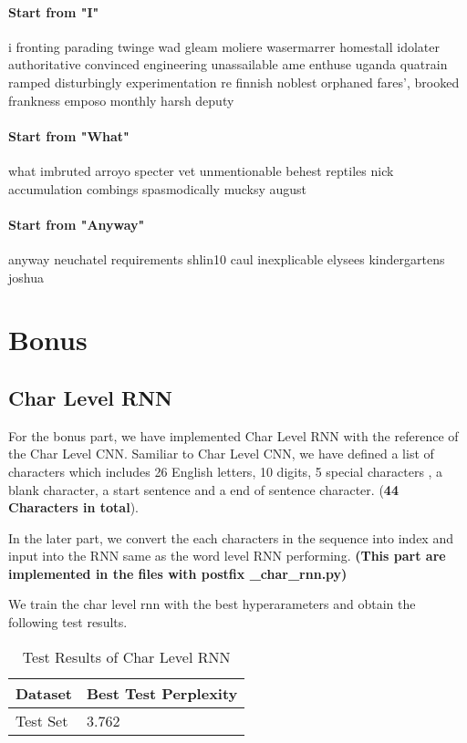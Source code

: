 \documentclass{article}
\begin{document}
\paragraph{Start from "I"} i fronting parading twinge wad gleam moliere wasermarrer homestall idolater authoritative convinced engineering unassailable ame enthuse uganda quatrain ramped disturbingly experimentation re finnish noblest orphaned fares', brooked frankness emposo monthly harsh deputy

\paragraph{Start from "What"} what imbruted arroyo specter vet unmentionable behest reptiles nick accumulation combings spasmodically mucksy august

\paragraph{Start from "Anyway"} anyway neuchatel requirements shlin10 caul inexplicable elysees kindergartens joshua

\pagebreak

\section{Bonus}

\subsection{Char Level RNN}
For the bonus part, we have implemented Char Level RNN with the reference of the Char Level CNN. Samiliar to Char Level CNN, we have defined a list of characters which includes 26 English letters, 10 digits, 5 special characters , a blank character, a start sentence and a end of sentence character. (\textbf{44 Characters in total}). 

In the later part, we convert the each characters in the sequence into index and input into the RNN same as the word level RNN performing.  \textbf{(This part are implemented in the files with postfix \_char\_rnn.py)}

We train the char level rnn with the best hyperarameters and obtain the following test results.

\begin{table}[htb]
	\caption{Test Results of Char Level RNN}
	\label{sample-table}
	\centering
	\begin{tabular}{ll}
		\toprule
		\cmidrule{1-2}
		Dataset & Best Test Perplexity\\
		\midrule
		Test Set & 3.762   \\
		\bottomrule
	\end{tabular}
\end{table}
\end{document}
